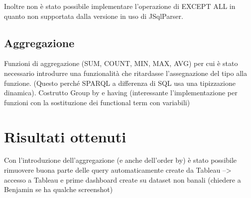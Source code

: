 Inoltre non è stato possibile implementare l'operazione di EXCEPT ALL in quanto non supportata dalla versione in uso di JSqlParser.

\subsection{Aggregazione}
Funzioni di aggregazione (SUM, COUNT, MIN, MAX, AVG) per cui è stato necessario introdurre una funzionalità che ritardasse l'assegnazione del
tipo alla funzione. (Questo perché SPARQL a differenza di SQL usa una tipizzazione dinamica).
Costrutto Group by e having (interessante l'implementazione per funzioni con la sostituzione dei functional term con variabili)

\section{Risultati ottenuti}
Con l'introduzione dell'aggregazione (e anche dell'order by) è stato possibile rimuovere buona parte delle query automaticamente create da Tableau --> accesso a Tableau
e prime dashboard create su dataset non banali (chiedere a Benjamin se ha qualche screenshot)
